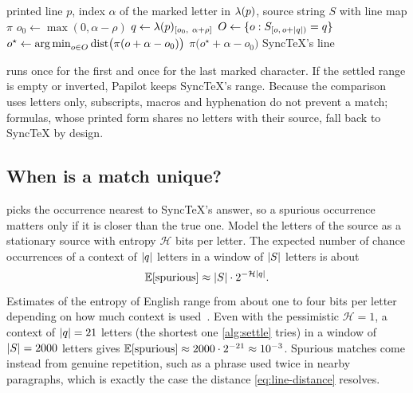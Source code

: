 \begin{algorithm}[t]
\caption{Settling one end of a selection}
\label{alg:settle}
\begin{algorithmic}[1]
\Require printed line $p$, index $\alpha$ of the marked letter in $\lambda(p)$, source string $S$ with line map $\pi$
 
  \State $o_0 \gets \max(0, \alpha - \rho)$
  \State $q \gets \lambda(p)_{[o_0,\ \alpha + \rho]}$
  \State $O \gets \{ o : S_{[o,\, o + \lvert q\rvert)} = q \}$
    \State $o^{\star} \gets \operatorname*{arg\,min}_{o \in O} \operatorname{dist}\bigl(\pi(o + \alpha - o_0)\bigr)$
    \State \Return $\pi\bigl(o^{\star} + \alpha - o_0\bigr)$
  \EndIf
\EndFor
\State \Return SyncTeX's line 
\end{algorithmic}
\end{algorithm}

 runs once for the first and once for the last marked
character. If the settled range is empty or inverted, Papilot keeps SyncTeX's
range. Because the comparison uses letters only, subscripts, macros and
hyphenation do not prevent a match; formulas, whose printed form shares no
letters with their source, fall back to SyncTeX by design.

\subsection{When is a match unique?}

 picks the occurrence nearest to SyncTeX's answer, so a
spurious occurrence matters only if it is closer than the true one. Model the
letters of the source as a stationary source with entropy $\mathcal{H}$ bits per letter.
The expected number of chance occurrences of a context of $\lvert q\rvert$ letters in
a window of $\lvert S\rvert$ letters is about
\begin{equation}
  \mathbb{E}[\text{spurious}] \approx \lvert S\rvert \cdot 2^{-\mathcal{H} \lvert q\rvert} .
  \label{eq:spurious}
\end{equation}
Estimates of the entropy of English range from about one to four bits per
letter depending on how much context is used~\cite{shannon1951}. Even with the
pessimistic $\mathcal{H} = 1$, a context of $\lvert q\rvert = 21$ letters (the shortest one
\cref{alg:settle} tries) in a window of $\lvert S\rvert = 2000$ letters gives
$\mathbb{E}[\text{spurious}] \approx 2000 \cdot 2^{-21} \approx 10^{-3}$. Spurious
matches come instead from genuine repetition, such as a phrase used twice in
nearby paragraphs, which is exactly the case the distance
\cref{eq:line-distance} resolves.

